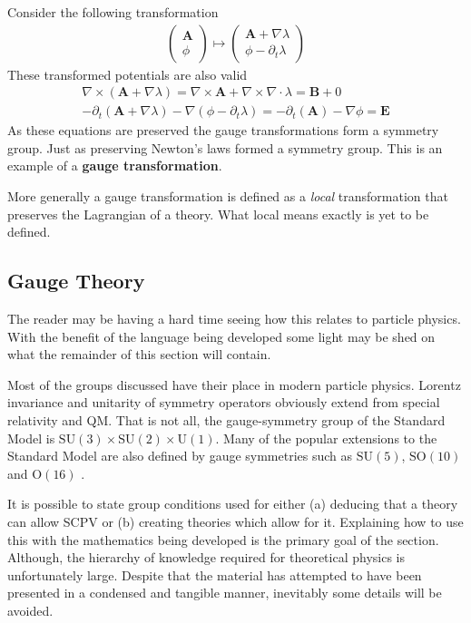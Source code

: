 Consider the following transformation
\begin{align*}
\left( \begin{array}{l}
\mathbf{A} \\ \phi
\end{array} \right) \mapsto
\left( \begin{array}{l}
\mathbf{A}+\nabla \lambda \\
\phi - \partial_t \lambda
\end{array} \right)
\end{align*}
These transformed potentials are also valid
\begin{align*}
\nabla \times (\mathbf{A}+\nabla \lambda) = \nabla\times \mathbf{A} + \nabla \times \nabla \cdot \lambda  = \mathbf{B} + 0 \\
-\partial_t(\mathbf{A}+\nabla \lambda)-\nabla (\phi - \partial_t \lambda) = -\partial_t(\mathbf{A})-\nabla \phi = \mathbf{E}
\end{align*}
As these equations are preserved the gauge transformations form a symmetry group. Just as preserving Newton's laws formed a symmetry group. This is an example of a \textbf{gauge transformation}.

More generally a gauge transformation is defined as a \textit{local} transformation that preserves the Lagrangian of a theory. What local means exactly is yet to be defined.

\subsection{Gauge Theory}

The reader may be having a hard time seeing how this relates to particle physics. With the benefit of the language being developed some light may be shed on what the remainder of this section will contain.

Most of the groups discussed have their place in modern particle physics. Lorentz invariance and unitarity of symmetry operators obviously extend from special relativity and QM. That is not all, the gauge-symmetry group of the Standard Model is $\mathrm{SU}(3)\times \mathrm{SU}(2)\times \mathrm{U}(1)$. Many of the popular extensions to the Standard Model are also defined by gauge symmetries such as $\mathrm{SU}(5)$, $\mathrm{SO}(10)$ and $\mathrm{O}(16)$ \cite{SCPV4}.

It is possible to state group conditions used for either (a) deducing that a theory can allow SCPV or (b) creating theories which allow for it\cite{SCPV5}. Explaining how to use this with the mathematics being developed is the primary goal of the section. Although, the hierarchy of knowledge required for theoretical physics is unfortunately large. Despite that the material has attempted to have been presented in a condensed and tangible manner, inevitably some details will be avoided.

